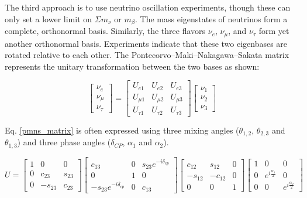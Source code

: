 The third approach is to use neutrino oscillation experiments, though these can only set a lower limit on $\Sigma m_\nu$ or $m_\beta$. The mass eigenstates of neutrinos form a complete, orthonormal basis. Similarly, the three flavors $\nu_e$, $\nu_\mu$, and $\nu_\tau$ form yet another orthonormal basis. Experiments indicate that these two eigenbases are rotated relative to each other. The Pontecorvo–Maki–Nakagawa–Sakata matrix represents the unitary transformation between the two bases as shown:

\begin{equation}\label{pmns_matrix}
\begin{bmatrix} \nu_e \\ \nu_\mu \\ \nu_\tau \end{bmatrix} = \begin{bmatrix} U_{e1} & U_{e2} & U_{e3}\\ U_{\mu 1} & U_{\mu 2} & U_{\mu 3} \\ U_{\tau 1} & U_{\tau 2} & U_{\tau 3} \end{bmatrix} \begin{bmatrix} \nu_1 \\ \nu_2 \\ \nu_3 \end{bmatrix}
\end{equation}

Eq. \ref{pmns_matrix} is often expressed using three mixing angles ($\theta_{1,2}$, $\theta_{2,3}$ and $\theta_{1,3}$) and three phase angles ($\delta_{CP}$, $\alpha_1$ and $\alpha_2$).

\begin{equation}\label{pmns_matrix_expanded}
U = \begin{bmatrix} 1 & 0 & 0\\ 0 & c_{23} & s_{23} \\ 0 & -s_{23} & c_{23} \end{bmatrix} \begin{bmatrix} c_{13} & 0 & s_{23}e^{-i\delta_{cp}}\\ 0 & 1 & 0 \\ -s_{23}e^{-i\delta_{cp}} & 0 & c_{13} \end{bmatrix} \begin{bmatrix} c_{12} & s_{12} & 0\\ -s_{12} & -c_{12} & 0 \\ 0 & 0 & 1 \end{bmatrix} \begin{bmatrix} 1 & 0 & 0\\ 0 & e^{i\frac{\alpha_1}{2}} & 0 \\ 0 & 0 & e^{i\frac{\alpha_2}{2}}\end{bmatrix}
\end{equation}

